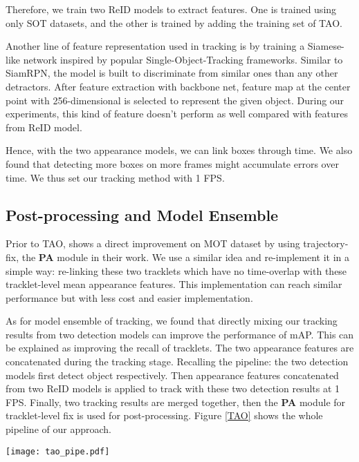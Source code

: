 \documentclass[runningheads]{llncs}
\begin{document}
Therefore, we train two ReID models to extract features. One is trained using only SOT datasets, and the other is trained by adding the training set of TAO.

Another line of feature representation used in tracking is by training a Siamese-like network inspired by popular Single-Object-Tracking frameworks. Similar to SiamRPN\cite{Li2019SiamRPN}, the model is built to discriminate from similar ones than any other detractors. After feature extraction with backbone net, feature map at the center point with 256-dimensional is selected to represent the given object. During our experiments, this kind of feature doesn't perform as well compared with features from ReID model.

Hence, with the two appearance models, we can link boxes through time. We also found that detecting more boxes on more frames might accumulate errors over time. We thus set our tracking method with 1 FPS.

\subsection{Post-processing and Model Ensemble}

Prior to TAO, \cite{tangmin} shows a direct improvement on MOT dataset by using trajectory-fix, the \textbf{PA} module in their work. We use a similar idea and re-implement it in a simple way: re-linking these two tracklets which have no time-overlap with these tracklet-level mean appearance features. This implementation can reach similar performance but with less cost and easier implementation.

As for model ensemble of tracking, we found that directly mixing our tracking results from two detection models can improve the performance of mAP. This can be explained as improving the recall of tracklets. The two appearance features are concatenated during the tracking stage. Recalling the pipeline: the two detection models first detect object respectively. Then appearance features concatenated from two ReID models is applied to track with these two detection results at 1 FPS. Finally, two tracking results are merged together, then the \textbf{PA} module for tracklet-level fix is used for post-processing. Figure \ref{TAO} shows the whole pipeline of our approach.


\begin{figure*}[h]
\begin{center}
\texttt{[image: tao\_pipe.pdf]}
\end{center}
   \caption{Pipeline of Our Approach}
\label{TAO}
\end{figure*}
\end{document}
